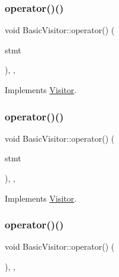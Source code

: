 \subsubsection{\texorpdfstring{operator()()}{operator()()}\hspace{0.1cm}{\footnotesize\ttfamily [39/60]}}
{\footnotesize\ttfamily void Basic\+Visitor\+::operator() (\begin{DoxyParamCaption}\item[{const \hyperlink{struct_throw_statement}{Throw\+Statement} \&}]{stmt }\end{DoxyParamCaption})\hspace{0.3cm}{\ttfamily [inline]}, {\ttfamily [override]}, {\ttfamily [virtual]}}



Implements \hyperlink{struct_visitor_a806a67e34e7866e3af078b3c2b421a24}{Visitor}.

\mbox{\label{struct_basic_visitor_a2b4e8d7c1f46d71adbc8bf2f4b597fcc}} 
\subsubsection{\texorpdfstring{operator()()}{operator()()}\hspace{0.1cm}{\footnotesize\ttfamily [40/60]}}
{\footnotesize\ttfamily void Basic\+Visitor\+::operator() (\begin{DoxyParamCaption}\item[{const \hyperlink{struct_try_statement}{Try\+Statement} \&}]{stmt }\end{DoxyParamCaption})\hspace{0.3cm}{\ttfamily [inline]}, {\ttfamily [override]}, {\ttfamily [virtual]}}



Implements \hyperlink{struct_visitor_af65bd8aa26745dea293f06d553d4f46f}{Visitor}.

\mbox{\label{struct_basic_visitor_a193c296097cb56beab2cc74165668df8}} 
\subsubsection{\texorpdfstring{operator()()}{operator()()}\hspace{0.1cm}{\footnotesize\ttfamily [41/60]}}
{\footnotesize\ttfamily void Basic\+Visitor\+::operator() (\begin{DoxyParamCaption}\item[{const \hyperlink{struct_debugger_statement}{Debugger\+Statement} \&}]{ }\end{DoxyParamCaption})\hspace{0.3cm}{\ttfamily [inline]}, {\ttfamily [override]}, {\ttfamily [virtual]}}



